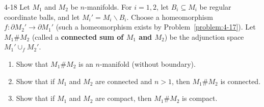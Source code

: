 \begin{problem}{4-18}\label{problem:4-18}
Let $M_{1}$ and $M_{2}$ be $n$-manifolds. For $i = 1, 2$, let $B_{i} \subseteq M_{i}$ be regular coordinate balls, and let $M_{i}' = M_{i} \smallsetminus B_{i}$. Choose a homeomorphism $f: \partial M_{2}' \to \partial M_{1}'$ (such a homeomorphism exists by Problem~\ref{problem:4-17}). Let $M_{1}\# M_{2}$ (called a \textbf{connected sum of $M_{1}$ and $M_{2}$}) be the adjunction space $M_{1}' \cup_{f} M_{2}'$.
\begin{enumerate}[label={(\alph*)}]
	\item Show that $M_{1} \# M_{2}$ is an $n$-manifold (without boundary).
	\item Show that if $M_{1}$ and $M_{2}$ are connected and $n > 1$, then $M_{1} \# M_{2}$ is connected.
	\item Show that if $M_{1}$ and $M_{2}$ are compact, then $M_{1}\# M_{2}$ is compact.
\end{enumerate}
\end{problem}

